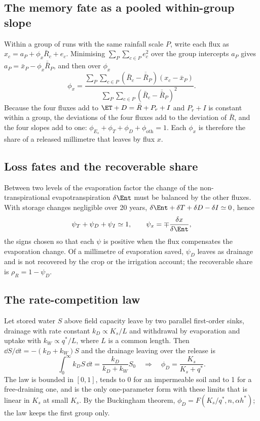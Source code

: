\subsection{The memory fate as a pooled within-group slope}
Within a group of runs with the same rainfall scale $P$, write each flux as $x_c=a_P+\phi_x\bar R_c+e_c$. Minimising $\sum_P\sum_{c\in P}e_c^2$ over the group intercepts $a_P$ gives $a_P=\bar x_P-\phi_x\overline{\bar R}_P$, and then over $\phi_x$
\begin{equation}\phi_x=\frac{\sum_P\sum_{c\in P}(\bar R_c-\overline{\bar R}_P)(x_c-\bar x_P)}{\sum_P\sum_{c\in P}(\bar R_c-\overline{\bar R}_P)^2}.\end{equation}
Because the four fluxes add to $\ET+D=\bar R+P_r+I$ and $P_r+I$ is constant within a group, the deviations of the four fluxes add to the deviation of $\bar R$, and the four slopes add to one: $\phi_{E_s}+\phi_T+\phi_D+\phi_{\mathrm{oth}}=1$. Each $\phi_x$ is therefore the share of a released millimetre that leaves by flux $x$.

\subsection{Loss fates and the recoverable share}
Between two levels of the evaporation factor the change of the non-transpirational evapotranspiration $\delta\Ent$ must be balanced by the other fluxes. With storage changes negligible over 20 years, $\delta\Ent+\delta T+\delta D-\delta I\simeq0$, hence
\begin{equation}\psi_T+\psi_D+\psi_I\simeq1,\qquad \psi_x=\mp\frac{\delta x}{\delta\Ent},\end{equation}
the signs chosen so that each $\psi$ is positive when the flux compensates the evaporation change. Of a millimetre of evaporation saved, $\psi_D$ leaves as drainage and is not recovered by the crop or the irrigation account; the recoverable share is $\rho_R=1-\psi_D$.

\subsection{The rate-competition law}
Let stored water $S$ above field capacity leave by two parallel first-order sinks, drainage with rate constant $k_D\propto K_s/L$ and withdrawal by evaporation and uptake with $k_W\propto q^\ast/L$, where $L$ is a common length. Then $\dd S/\dd t=-(k_D+k_W)S$ and the drainage leaving over the release is
\begin{equation}\int_0^\infty k_DS\,\dd t=\frac{k_D}{k_D+k_W}S_0\quad\Longrightarrow\quad\phi_D=\frac{K_s}{K_s+q^\ast}.\end{equation}
The law is bounded in $[0,1]$, tends to 0 for an impermeable soil and to 1 for a free-draining one, and is the only one-parameter form with these limits that is linear in $K_s$ at small $K_s$. By the Buckingham theorem, $\phi_D=F(K_s/q^\ast,n,\alpha h^\ast)$; the law keeps the first group only.

